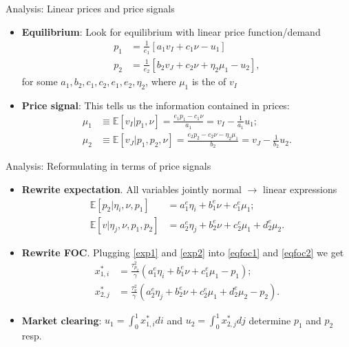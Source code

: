 \documentclass[english,10pt
,aspectratio=169
]{beamer}
\begin{document}
\begin{frame}{Analysis: Linear prices and price signals}
	\begin{itemize}
		\item \textbf{Equilibrium}: Look for equilibrium with linear price function/demand
		\begin{align}
			p_1 & = \frac{1}{e_1}\left[a_1 v_I + c_1 \nu - u_1 \right]\label{price1}\\
			p_2 & =\frac{1}{e_2}\left[ b_2 v_J + c_2 \nu +  \eta_2 \mu_1-u_2 \right], \label{price2}
		\end{align}
		for some $a_1,b_2,c_1,c_2,e_1,e_2,\eta_2$, 
		where $\mu_1$ is the  of $v_I$
		\item \textbf{Price signal}: This tells us the information contained in prices:
		\begin{align}
			\mu_1 & \equiv \mathbb{E}[v_I|p_1,\nu]= \frac{e_1 p_1-c_1 \nu}{a_1} = v_I - \frac{1}{a_1} u_1 ; \label{signal1} \\
			\mu_2 & \equiv \mathbb{E}[v_J|p_1,p_2,\nu]= \frac{e_2 p_2-c_2 \nu - \eta_2 \mu_1}{b_2} = v_J - \frac{1}{b_2} u_2. \label{signal2}
		\end{align}
	\end{itemize}
\end{frame}


\begin{frame}{Analysis: Reformulating in terms of price signals}
	\begin{itemize}
		\item \textbf{Rewrite expectation}. All variables jointly normal $\rightarrow$ linear expressions
		\begin{align}
		\mathbb{E}[p_2| \eta_i, \nu, p_1] & = a^e_1 \eta_i+b^e_1 \nu +c^e_1 \mu_1;   \label{exp1} \\
		\mathbb{E}[v| \eta_j, \nu, p_1, p_2] & =  a^e_2 \eta_j+b^e_2 \nu +c^e_2 \mu_1 +d^e_2 \mu_2. \label{exp2}
		\end{align}
		\item \textbf{Rewrite FOC}. Plugging \eqref{exp1} and \eqref{exp2} into \eqref{eqfoc1} and \eqref{eqfoc2} we get
		\begin{align}
		x^*_{1,i} &= \frac{\tau^2_{p_2}}{\gamma}(a^e_1 \eta_i+b^e_1 \nu +c^e_1 \mu_1 - p_1); \label{eqfocb1} \\
		x^*_{2,j} &= \frac{\tau^2_v}{\gamma}(a^e_2 \eta_j+b^e_2 \nu +c^e_2 \mu_1 +d^e_2 \mu_2 - p_2). \label{eqfocb2}
		\end{align}
		\item \textbf{Market clearing}: $u_1=\int_0^1 x^*_{1,i} di$ and $u_2=\int_0^1 x^*_{2,j} dj$ determine $p_1$ and $p_2$ resp.
	\end{itemize}
\end{frame}
\end{document}
